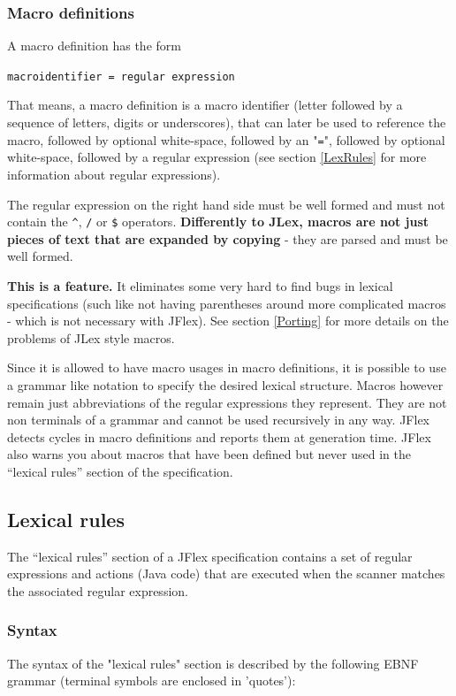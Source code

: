 \documentclass[11pt]{scrartcl}
\begin{document}
\subsubsection{Macro definitions\label{MacroDefs}}
A macro definition has the form

\texttt{macroidentifier = regular expression}

That means, a macro definition is a macro identifier (letter followed
by a sequence of letters, digits or underscores), that can later be
used to reference the macro, followed by optional white-space, followed
by an "\texttt{=}", followed by optional white-space, followed by a
regular expression (see section \ref{LexRules}  for more information about regular expressions).

The regular expression on the right hand side must be well formed and
must not contain the \verb+^+, \texttt{/} or \texttt{\$} operators. {\bf Differently
to JLex, macros are not just pieces of text that are expanded by copying}
- they are parsed and must be well formed.

{\bf This is a feature.} It eliminates some very hard to find bugs in
lexical specifications (such like not having parentheses around more
complicated macros - which is not necessary with JFlex).  See section
\ref{Porting}  for more
details on the problems of JLex style macros.

Since it is allowed to have macro usages in macro definitions, it is
possible to use a grammar like notation to specify the desired lexical
structure. Macros however remain just abbreviations of the regular expressions
they represent. They are not non terminals of a grammar and cannot be used
recursively in any way. JFlex detects cycles in macro definitions and reports
them at generation time. JFlex also warns you about macros that have been
defined but never used in the ``lexical rules'' section of the specification.
  
\subsection{Lexical rules\label{LexRules}}
The ``lexical rules'' section of a JFlex specification contains a set of
regular expressions and actions (Java code) that are executed when the
scanner matches the associated regular expression.
 
\subsubsection{Syntax\label{Grammar}}
The syntax of the "lexical rules" section is described by the following
EBNF grammar (terminal symbols are enclosed in 'quotes'):
\end{document}
